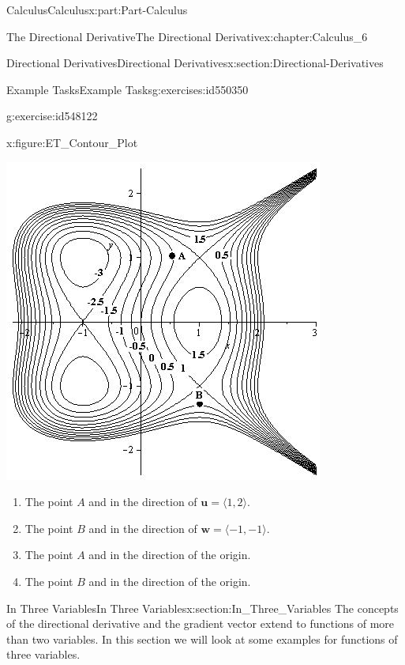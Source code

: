 \documentclass[oneside,10pt,]{book}
\numberwithin{equation}{section}
\newcommand{\bm}[1]{\boldsymbol{#1}}
\begin{document}
\begin{partptx}{Calculus}{}{Calculus}{}{}{x:part:Part-Calculus}
\begin{chapterptx}{The Directional Derivative}{}{The Directional Derivative}{}{}{x:chapter:Calculus_6}
\begin{sectionptx}{Directional Derivatives}{}{Directional Derivatives}{}{}{x:section:Directional-Derivatives}
\begin{exercises-subsection-numberless}{Example Tasks}{}{Example Tasks}{}{}{g:exercises:id550350}
\begin{divisionexercise}{4}{}{}{g:exercise:id548122}
\begin{figureptx}{}{x:figure:ET_Contour_Plot}{}
\begin{image}{0.15}{0.7}{0.15}
\includegraphics[width=\linewidth]{./Calculus/Images/6/Example-Task-4_Contour_Plot.png}
\end{image}%
\tcblower
\end{figureptx}%
%
\begin{enumerate}[label=\alph*]
\item{}The point \(A\) and in the direction of \(\bm{u} = \langle 1,2 \rangle\).%
\item{}The point \(B\) and in the direction of \(\bm{w} = \langle -1,-1 \rangle\).%
\item{}The point \(A\) and in the direction of the origin.%
\item{}The point \(B\) and in the direction of the origin.%
\end{enumerate}
%
\end{divisionexercise}%
\end{exercises-subsection-numberless}
\end{sectionptx}
%
%
\typeout{************************************************}
\typeout{************************************************}
%
\begin{sectionptx}{In Three Variables}{}{In Three Variables}{}{}{x:section:In_Three_Variables}
The concepts of the directional derivative and the gradient vector extend to functions of more than two variables. In this section we will look at some examples for functions of three variables.%

\end{sectionptx}
\end{chapterptx}
\end{partptx}
\end{document}
